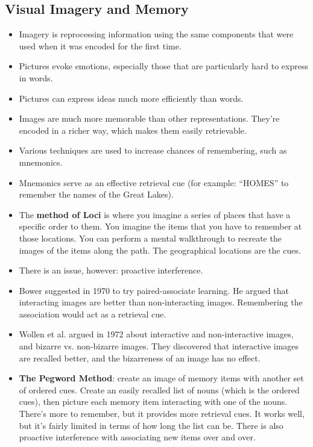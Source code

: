 \documentclass[]{article}
\begin{document}
		\subsection{Visual Imagery and Memory}
			\begin{itemize}
				\item Imagery is reprocessing information using the same components that were used when it was encoded for the first time.
				\item Pictures evoke emotions, especially those that are particularly hard to express in words.
				\item Pictures can express ideas much more efficiently than words.
				\item Images are much more memorable than other representations. They're encoded in a richer way, which makes them easily retrievable.
				\item Various techniques are used to increase chances of remembering, such as mnemonics.
				\item Mnemonics serve as an effective retrieval cue (for example: ``HOMES'' to remember the names of the Great Lakes).
				\item The \textbf{method of Loci} is where you imagine a series of places that have a specific order to them. You imagine the items that you have to remember at those locations. You can perform a mental walkthrough to recreate the images of the items along the path. The geographical locations are the cues.
				\item There is an issue, however: proactive interference.
				\item Bower suggested in 1970 to try paired-associate learning. He argued that interacting images are better than non-interacting images. Remembering the association would act as a retrieval cue.
				\item Wollen et al. argued in 1972 about interactive and non-interactive images, and bizarre vs. non-bizarre images. They discovered that interactive images are recalled better, and the bizarreness of an image has no effect.
				\item \textbf{The Pegword Method}: create an image of memory items with another set of ordered cues. Create an easily recalled list of nouns (which is the ordered cues), then picture each memory item interacting with one of the nouns. There's more to remember, but it provides more retrieval cues. It works well, but it's fairly limited in terms of how long the list can be. There is also proactive interference with associating new items over and over.

\end{itemize}
\end{document}
